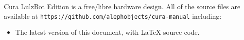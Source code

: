 %
%
%
%
%

Cura LulzBot\textsuperscript{\miniscule{\texttrademark}} Edition is a free/libre hardware design. All of the source files are available at \texttt{https://github.com/alephobjects/cura-manual} including:

\begin{itemize}
\item The latest version of this document, with {\LaTeX} source code.


\end{itemize}

